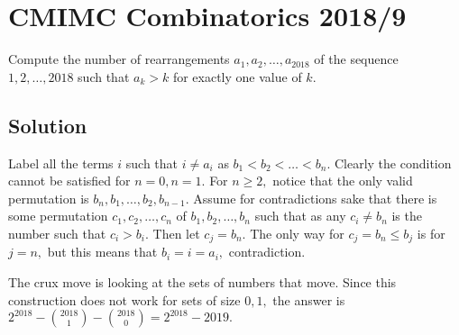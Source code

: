 \documentclass{article}
\begin{document}
\pagebreak\section{CMIMC Combinatorics 2018/9}
Compute the number of rearrangements $a_1,a_2,\ldots,a_{2018}$ of the sequence $1,2,\ldots,2018$ such that $a_k>k$ for exactly one value of $k.$

\subsection{Solution}
Label all the terms $i$ such that $i\neq a_i$ as $b_1<b_2<\ldots<b_n.$ Clearly the condition cannot be satisfied for $n=0,n=1.$ For $n\geq 2,$ notice that the only valid permutation is $b_n,b_1,\ldots,b_2,b_{n-1}.$ Assume for contradictions sake that there is some permutation $c_1,c_2,\ldots, c_n$ of $b_1,b_2,\ldots,b_n$ such that as any $c_i\neq b_n$ is the number such that $c_i>b_i.$ Then let $c_j=b_n.$ The only way for $c_j=b_n\leq b_j$ is for $j=n,$ but this means that $b_i=i=a_i,$ contradiction.
    
The crux move is looking at the sets of numbers that move. Since this construction does not work for sets of size $0,1,$ the answer is $2^{2018}-\binom{2018}{1}-\binom{2018}{0}=2^{2018}-2019.$
\end{document}
